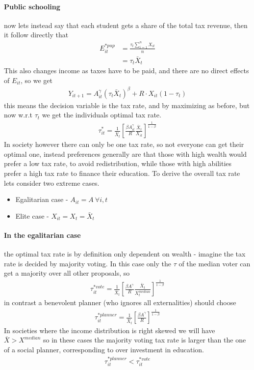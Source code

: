 \documentclass[12pt, a4paper]{article}
\begin{document}
\begin{multicols}{2}
\paragraph{Public schooling} now lets instead say that each student gets a share of the total tax revenue, then it follow directly that
\begin{align*}
E_{it}^{*pup} &= \frac{\tau_t \sum_{i=1}^n X_{it}}{n} \\
&= \tau_t \bar{X}_t
\end{align*}
This also changes income as taxes have to be paid, and there are no direct effects of $E_{it}$, so we get
\begin{align*}
Y_{it+1} = A_{it}^{\gamma}(\tau_t \bar{X}_t)^{\beta} + R \cdot X_{it}(1-\tau_t)
\end{align*}
this means the decision variable is the tax rate, and by maximizing as before, but now w.r.t $\tau_t$ we get the individuals optimal tax rate.
\begin{align*}
\tau_{it}^{*} = \frac{1}{\bar{X}_t} \left[ \frac{\beta A_{it}^{\gamma}}{R} \frac{\bar{X}_t}{X_{it}} \right]^{\frac{1}{1-\beta}}
\end{align*}
In society however there can only be one tax rate, so not everyone can get their optimal one, instead preferences generally are that those with high wealth would prefer a low tax rate, to avoid redistribution, while those with high abilities prefer a high tax rate to finance their education. To derive the overall tax rate lets consider two extreme cases.
\begin{itemize}
\item Egalitarian case - $A_{it}= A \ \forall i,t$
\item Elite case - $X_{it}= X_t = \bar{X}_t$
\end{itemize}

\paragraph{In the egalitarian case} the optimal tax rate is by definition only dependent on wealth - imagine the tax rate is decided by majority voting. In this case only the $\tau$ of the median voter can get a majority over all other proposals, so
\begin{align*}
\tau_{it}^{*vote} = \frac{1}{\bar{X}_t} \left[ \frac{\beta A^{\gamma}}{R} \frac{\bar{X}_t}{X_{t}^{median}} \right]^{\frac{1}{1-\beta}}
\end{align*}
in contrast a benevolent planner (who ignores all externalities) should choose
\begin{align*}
\tau_{it}^{*planner} = \frac{1}{\bar{X}_t} \left[ \frac{\beta A^{\gamma}}{R}  \right]^{\frac{1}{1-\beta}}
\end{align*}
In societies where the income distribution is right skewed we will have $\bar{X}>X^{median}$ so in these cases the majority voting tax rate is larger than the one of a social planner, corresponding to over investment in education.
\begin{align*}
\tau_{it}^{*planner} < \tau_{it}^{*vote}
\end{align*}



\end{multicols}
\end{document}
